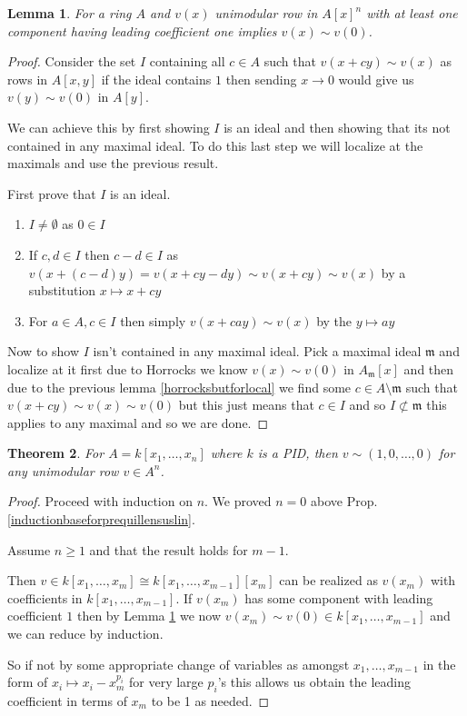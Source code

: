 \documentclass[12pt]{article}
\numberwithin{equation}{section}
\newtheorem{theorem}{Theorem}[section]
\newtheorem{lemma}[theorem]{Lemma}
\begin{document}
	\begin{lemma}\label{horrocksbuteverything}
		For a ring $A$ and $v(x)$ unimodular row in $A[x]^n$ with at least one component having leading coefficient one implies $v(x) \sim v(0)$.
	\end{lemma}
	\begin{proof}
		Consider the set $I$ containing all $c \in A$ such that $v(x+cy)\sim v(x)$ as rows in $A[x,y]$ if the ideal contains $1$ then sending $x \to 0$ would give us $v(y)\sim v(0) $ in $A[y].$
		
		We can achieve this by first showing $I$ is an ideal and then showing that its not contained in any maximal ideal.	To do this last step we will localize at the maximals and use the previous result.
		
		First prove that $I$ is an ideal.
		\begin{enumerate}
			\item $I \neq \emptyset $ as $0 \in I$
			\item If $c,d \in I$ then $c-d \in I$ as $v(x+(c-d)y)=v(x+cy-dy) \sim v(x+cy) \sim v(x)$ by a substitution $x \mapsto x+cy$
			\item For $a \in A, c \in I$ then simply $v(x+cay) \sim v(x)$ by the $y \mapsto ay$
		\end{enumerate}
		
		Now to show $I$ isn't contained in any maximal ideal. Pick a maximal ideal $\mathfrak m$ and localize at it first due to Horrocks we know $v(x) \sim v(0) $ in $A_{\mathfrak m} [x]$ and then due to the previous lemma \ref{horrocksbutforlocal} we find some $c \in A\setminus \mathfrak m$ such that $v(x+cy) \sim v(x) \sim v(0)$ but this just means that $ c \in I$ and so $I\not \subset \mathfrak m$ this applies to any maximal and so we are done.  
	\end{proof}
	
	\begin{theorem}
		For $A=k[x_1, \dots, x_n]$ where $k $ is a PID, then $v \sim (1,0,\dots, 0)$ for any unimodular row $v \in A^n$.
	\end{theorem}
	\begin{proof}
		Proceed with induction on $n$. We proved $n=0$ above Prop. \ref{inductionbaseforprequillensuslin}.
		
		Assume $n\geq 1$ and that the result holds for $m-1$.
		
		Then $v \in k[x_1, \dots, x_m] \cong k[x_1,\dots, x_{m-1}] [x_m]$ can be realized as $v(x_m) $ with coefficients in $k[x_1,\dots, x_{m-1}]$. If $v(x_m)$ has some component with leading coefficient $1$ then by Lemma \ref{horrocksbuteverything} we now $v(x_m) \sim v(0) \in k[x_1, \dots, x_{m-1}]$ and we can reduce by induction.
		
		So if not by some appropriate change of variables as amongst $x_1, \dots, x_{m-1}$ in the form of $x_i \mapsto x_i-x_m^{p_i}$ for very large $p_i$'s this allows us obtain the leading coefficient in terms of $x_m$ to be 1 as needed.
	\end{proof}
\end{document}
